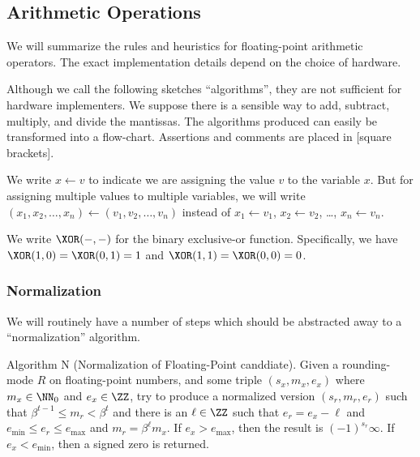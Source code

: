 \subsection{Arithmetic Operations}

We will summarize the rules and heuristics for floating-point arithmetic
operators. The exact implementation details depend on the choice of
hardware.

\begin{danger}
  Although we call the following sketches ``algorithms'', they are not
  sufficient for hardware implementers. We suppose there is a sensible
  way to add, subtract, multiply, and divide the mantissas. The
  algorithms produced can easily be transformed into a
  flow-chart. Assertions and comments are placed in [square brackets].
\end{danger}

\begin{notation}
  We write $x\gets v$ to indicate we are assigning the value $v$ to the
  variable $x$. But for assigning multiple values to multiple variables,
  we will write $(x_{1}, x_{2}, \dots, x_{n})\gets(v_{1},v_{2},\dots,v_{n})$
  instead of $x_{1}\gets v_{1}$, $x_{2}\gets v_{2}$, \dots, $x_{n}\gets v_{n}$.
\end{notation}

\begin{notation}
  We write $\XOR(-,-)$ for the binary exclusive-or
  function. Specifically, we have $\XOR(1,0)=\XOR(0,1)=1$ and
  $\XOR(1,1)=\XOR(0,0)=0$.
\end{notation}

\subsubsection{Normalization}

We will routinely have a number of steps which should be abstracted away
to a ``normalization'' algorithm.

\algbegin Algorithm N (Normalization of Floating-Point canddiate). Given
a rounding-mode $R$ on floating-point numbers, and
some triple $(s_{x}, m_{x}, e_{x})$ where $m_{x}\in\NN_{0}$ and
$e_{x}\in\ZZ$, try to produce a normalized version $(s_{r}, m_{r}, e_{r})$
such that $\beta^{t-1}\leq m_{r}<\beta^{t}$ and there is an $\ell\in\ZZ$
such that $e_{r}=e_{x}-\ell$ and $e_{\text{min}}\leq e_{r}\leq e_{\text{max}}$
and $m_{r} = \beta^{\ell}m_{x}$. If $e_{x}> e_{\text{max}}$, then the
result is $(-1)^{s_{r}}\infty$. If $e_{x} < e_{\text{min}}$, then a
signed zero is returned.

